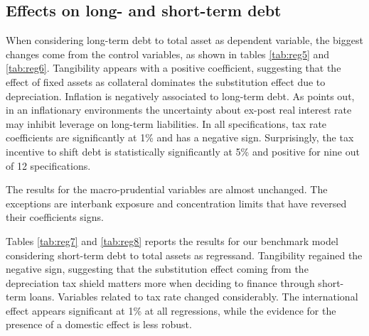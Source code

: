 \documentclass[12pt]{article}
\begin{document}
	\subsection{Effects on long- and short-term debt} \label{subsec:long_short}
	When considering long-term debt to total asset as dependent variable, the biggest changes come from the control variables, as shown in tables \ref{tab:reg5} and \ref{tab:reg6}. Tangibility appears with a positive coefficient, suggesting that the effect of fixed assets as collateral dominates the substitution effect due to depreciation. Inflation is negatively associated to long-term debt. As \cite{huizinga2008capital} points out, in an inflationary environments the uncertainty about ex-post real interest rate may inhibit leverage on long-term liabilities. In all specifications, tax rate coefficients are significantly at 1\% and has a negative sign. Surprisingly, the tax incentive to shift debt is statistically significantly at 5\% and positive for nine out of 12 specifications.
	
	 
\begin{table}	
	\caption{}
	\scalebox{0.8}{}
	\label{tab:reg5}
\end{table}
The results for the macro-prudential variables are almost unchanged. The exceptions are interbank exposure and concentration limits that have reversed their coefficients signs. 
\begin{table}	
	\caption{}
	\scalebox{0.8}{}
	\label{tab:reg6}
\end{table}
Tables \ref{tab:reg7} and \ref{tab:reg8} reports the results for our benchmark model considering short-term debt to total assets as regressand. Tangibility regained the negative sign, suggesting that the substitution effect coming from the depreciation tax shield matters more when deciding to finance through short-term loans. Variables related to tax rate changed considerably. The international effect appears significant at 1\% at all regressions, while the evidence for the presence of a domestic effect is less robust.
\begin{table}
\caption{}
\scalebox{0.8}{}
\label{tab:reg7}
\end{table}
\begin{table}	
\caption{}
\scalebox{0.8}{}
\label{tab:reg8}
\end{table}
\end{document}
